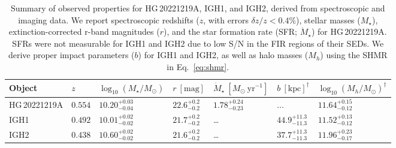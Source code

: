 \documentclass[twocolumn, linenumbers, tra]{aastex631}
\begin{document}
\begin{table*}
  \caption{Summary of observed properties for HG\,20221219A, IGH1, and IGH2, derived from spectroscopic and imaging data. We report spectroscopic redshifts ($z$, with errors $\delta z/z < 0.4\%$), stellar masses ($M_\star$), extinction-corrected r-band magnitudes ($r$), and the star formation rate (SFR; $\dot{M}_{\star}$) for HG\,20221219A. SFRs were not measurable for IGH1 and IGH2 due to low S/N in the FIR regions of their SEDs. We derive proper impact parameters ($b$) for IGH1 and IGH2, as well as halo masses ($M_h$) using the SHMR in Eq.~\ref{eq:shmr}.}
  \label{tab:hostintprops}
  \centering
  \begin{tabularx}{\textwidth}{@{\extracolsep{\fill}}XXXXXXX}
    \hline \hline
    Object & $z$ & \hspace{-0.75cm} $\log_{10}\left(M_{\star}/M_\odot\right)$ & $r\ \left[\mathrm{mag}\right]$ & \hspace{-0.5cm} $\dot{M}_{\star}\ \left[M_{\odot}\ \mathrm{yr}^{-1}\right]$ & \hspace{-0.2cm} $b\ \left[\mathrm{kpc}\right]^{\dagger}$ & \hspace{-0.5cm} $\log_{10}\left(M_{h}/M_\odot\right)^{\dagger}$ \\
    \hline
    HG\,20221219A & $0.554$ & \hspace{-0.75cm} $10.20_{-0.04}^{+0.03}$ & $22.6_{-0.2}^{+0.2}$ & \hspace{-0.5cm} $1.78_{-0.23}^{+0.24}$ & \hspace{-0.2cm} $\ldots$ & \hspace{-0.5cm} $11.64_{-0.12}^{+0.15}$\\
    IGH1 & $0.492$ & \hspace{-0.75cm} $10.01_{-0.02}^{+0.02}$ & $21.7_{-0.2}^{+0.2}$ & \hspace{-0.5cm} \ldots & \hspace{-0.2cm} $44.9_{-11.3}^{+11.3}$ & \hspace{-0.5cm} $11.52_{-0.12}^{+0.13}$ \\
    IGH2 & $0.438$ & \hspace{-0.75cm} $10.60_{-0.02}^{+0.02}$ & $21.6_{-0.2}^{+0.2}$ & \hspace{-0.5cm} \ldots & \hspace{-0.2cm} $37.7_{-11.3}^{+11.3}$ & \hspace{-0.5cm} $11.96_{-0.17}^{+0.23}$ \\
    \hline
  \end{tabularx}
\end{table*}
\end{document}
